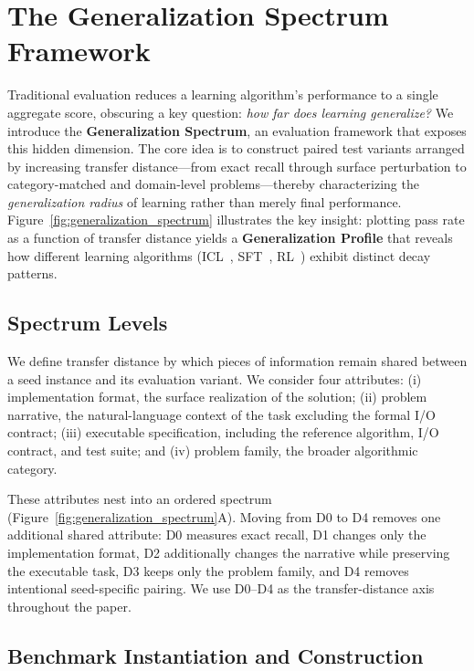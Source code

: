 \documentclass[]{bytedance_seed}
\theoremstyle{plain}
\theoremstyle{definition}
\theoremstyle{remark}
\begin{document}
\section{The Generalization Spectrum Framework}
\label{sec:spectrum}

Traditional evaluation reduces a learning algorithm's performance to a single aggregate score, obscuring a key question: \emph{how far does learning generalize?} We introduce the \textbf{Generalization Spectrum}, an evaluation framework that exposes this hidden dimension. The core idea is to construct paired test variants arranged by increasing transfer distance---from exact recall through surface perturbation to category-matched and domain-level problems---thereby characterizing the \emph{generalization radius} of learning rather than merely final performance. Figure~\ref{fig:generalization_spectrum} illustrates the key insight: plotting pass rate as a function of transfer distance yields a \textbf{Generalization Profile} that reveals how different learning algorithms (ICL~\citep{brown2020language}, SFT~\citep{ouyang2022training}, RL~\citep{schulman2017ppo,shao2024grpo,yu2025dapo}) exhibit distinct decay patterns.


\subsection{Spectrum Levels}
\label{subsec:spectrum-levels}

We define transfer distance by which pieces of information remain shared between a seed instance and its evaluation variant.
We consider four attributes: (i) implementation format, the surface realization of the solution; 
(ii) problem narrative, the natural-language context of the task excluding the formal I/O contract; 
(iii) executable specification, including the reference algorithm, I/O contract, and test suite; 
and (iv) problem family, the broader algorithmic category. 

These attributes nest into an ordered spectrum (Figure~\ref{fig:generalization_spectrum}A). Moving from D0 to D4 removes one additional shared attribute: D0 measures exact recall, D1 changes only the implementation format, D2 additionally changes the narrative while preserving the executable task, D3 keeps only the problem family, and D4 removes intentional seed-specific pairing. We use D0--D4 as the transfer-distance axis throughout the paper.




\subsection{Benchmark Instantiation and Construction}
\label{subsec:benchmark}
\end{document}
